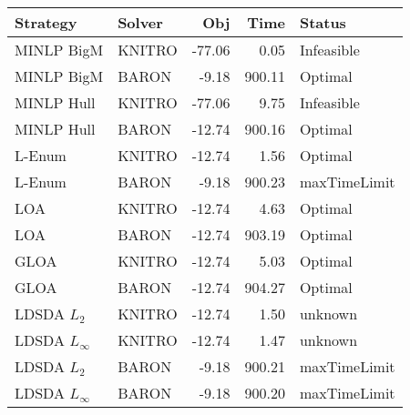 \begin{tabular}{llrrl}
\toprule
Strategy & Solver & Obj & Time & Status \\
\midrule
MINLP BigM & KNITRO & -77.06 & 0.05 & Infeasible \\
MINLP BigM & BARON & -9.18 & 900.11 & Optimal \\
MINLP Hull & KNITRO & -77.06 & 9.75 & Infeasible \\
MINLP Hull & BARON & -12.74 & 900.16 & Optimal \\
L-Enum & KNITRO & -12.74 & 1.56 & Optimal \\
L-Enum & BARON & -9.18 & 900.23 & maxTimeLimit \\
LOA & KNITRO & -12.74 & 4.63 & Optimal \\
LOA & BARON & -12.74 & 903.19 & Optimal \\
GLOA & KNITRO & -12.74 & 5.03 & Optimal \\
GLOA & BARON & -12.74 & 904.27 & Optimal \\
LDSDA $L_2$ & KNITRO & -12.74 & 1.50 & unknown \\
LDSDA $L_\infty$ & KNITRO & -12.74 & 1.47 & unknown \\
LDSDA $L_2$ & BARON & -9.18 & 900.21 & maxTimeLimit \\
LDSDA $L_\infty$ & BARON & -9.18 & 900.20 & maxTimeLimit \\
\bottomrule
\end{tabular}

